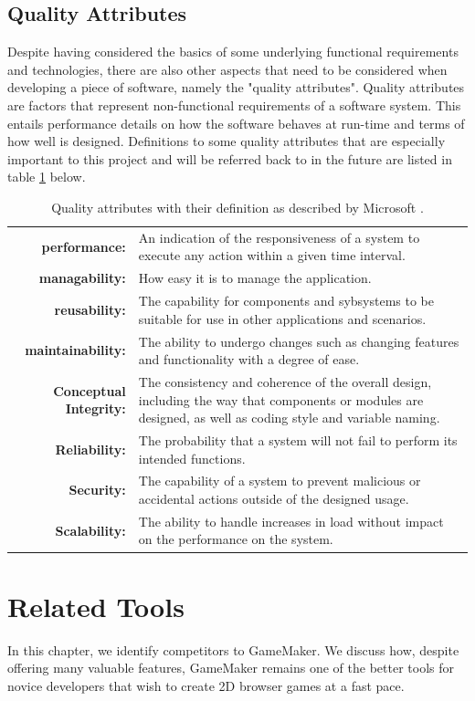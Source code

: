 \documentclass[bsc, 12pt, twoside, singlespacing, parskip, abbrevs, notimes, normalheadings, logo]{styles/infthesis}
\begin{document}
\section{Quality Attributes}
Despite having considered the basics of some underlying functional requirements and technologies, there are also other aspects that need to be considered when developing a piece of software, namely the "quality attributes". Quality attributes are factors that represent non-functional requirements of a software system. This entails performance details on how the software behaves at run-time and terms of how well is designed. Definitions to some quality attributes that are especially important to this project and will be referred back to in the future are listed in table \ref{table:quality_attributes} below.
 
\begin{table}[H]
\centering
  \begin{tabularx}{\textwidth}{r X}
	\textbf{performance:} & An indication of the responsiveness of a system to execute any action within a given time interval.\\
	\textbf{managability:} & How easy it is to manage the application.\\
	\textbf{reusability:} & The capability for components and sybsystems to be suitable for use in other applications and scenarios.\\
	\textbf{maintainability:} & The ability to undergo changes such as changing features and functionality with a degree of ease.\\
	\textbf{Conceptual Integrity:} & The consistency and coherence of the overall design, including the way that components or modules are designed, as well as coding style and variable naming.\\
	\textbf{Reliability:} & The probability that a system will not fail to perform its intended functions. \\
	\textbf{Security:} & The capability of a system to prevent malicious or accidental actions outside of the designed usage. \\
	\textbf{Scalability:} & The ability to handle increases in load without impact on the performance on the system. \\
  \end{tabularx}
  \caption{Quality attributes with their definition as described by Microsoft \cite{quality_attributes}.}
\label{table:quality_attributes}
\end{table}

\chapter{Related Tools}
In this chapter, we identify competitors to GameMaker. We discuss how, despite offering many valuable features, GameMaker remains one of the better tools for novice developers that wish to create 2D browser games at a fast pace.
\end{document}
